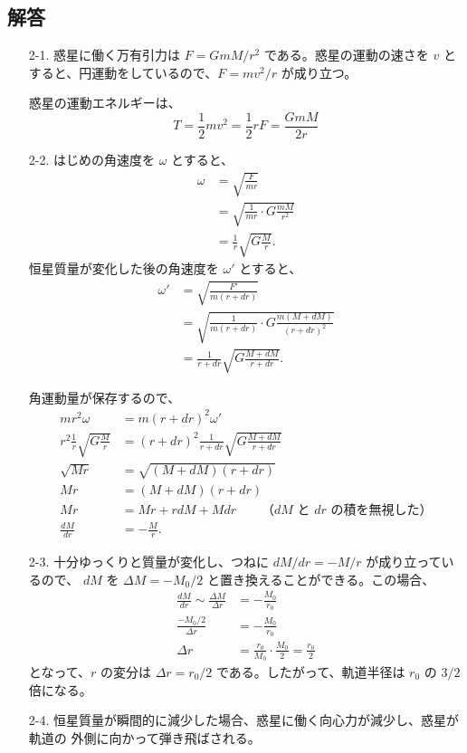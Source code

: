 \documentclass[report]{dennou777}
\begin{document}
\subsection*{解答}
\begin{itemize}
	\item[2-1.]
		惑星に働く万有引力は $F=GmM/r^2$ である。惑星の運動の速さを $v$ と
		すると、円運動をしているので、$F=mv^2/r$ が成り立つ。

		惑星の運動エネルギーは、
		\[T=\frac{1}{2}mv^2=\frac{1}{2}rF=\frac{GmM}{2r}\]
	\item[2-2.]
		はじめの角速度を $\omega$ とすると、
		\begin{align*}
			\omega&=\sqrt{\frac{F}{mr}}\\
			&=\sqrt{\frac{1}{mr}\cdot G\frac{mM}{r^2}}\\
			&=\frac{1}{r}\sqrt{G\frac{M}{r}}.
		\end{align*}
		恒星質量が変化した後の角速度を $\omega'$ とすると、
		\begin{align*}
			\omega'&=\sqrt{\frac{F'}{m(r+dr)}}\\
			&=\sqrt{\frac{1}{m(r+dr)}\cdot G\frac{m(M+dM)}{(r+dr)^2}}\\
			&=\frac{1}{r+dr}\sqrt{G\frac{M+dM}{r+dr}}.
		\end{align*}
	
		角運動量が保存するので、
		\begin{align*}
			mr^2\omega&=m(r+dr)^2\omega'\\
			r^2\frac{1}{r}\sqrt{G\frac{M}{r}}&=(r+dr)^2\frac{1}{r+dr}\sqrt{G\frac{M+dM}{r+dr}}\\
			\sqrt{Mr}&=\sqrt{(M+dM)(r+dr)}\\
			Mr&=(M+dM)(r+dr)\\
			Mr&=Mr+rdM+Mdr\qquad\text{（$dM$ と $dr$ の積を無視した）}\\
			\frac{dM}{dr}&=-\frac{M}{r}.
		\end{align*}
	\item[2-3.]
		十分ゆっくりと質量が変化し、つねに $dM/dr=-M/r$ が成り立っているので、
		$dM$ を $\Delta M=-M_0/2$ と置き換えることができる。この場合、
		\begin{align*}
			\frac{dM}{dr}\sim\frac{\Delta M}{\Delta r}&=-\frac{M_0}{r_0}\\
			\frac{-M_0/2}{\Delta r}&=-\frac{M_0}{r_0}\\
			\Delta r&=\frac{r_0}{M_0}\cdot\frac{M_0}{2}=\frac{r_0}{2}
		\end{align*}
		となって、$r$ の変分は $\Delta r=r_0/2$ である。したがって、軌道半径は
		$r_0$ の $3/2$ 倍になる。
	\item[2-4.]
		恒星質量が瞬間的に減少した場合、惑星に働く向心力が減少し、惑星が軌道の
		外側に向かって弾き飛ばされる。
\end{itemize}
\end{document}
